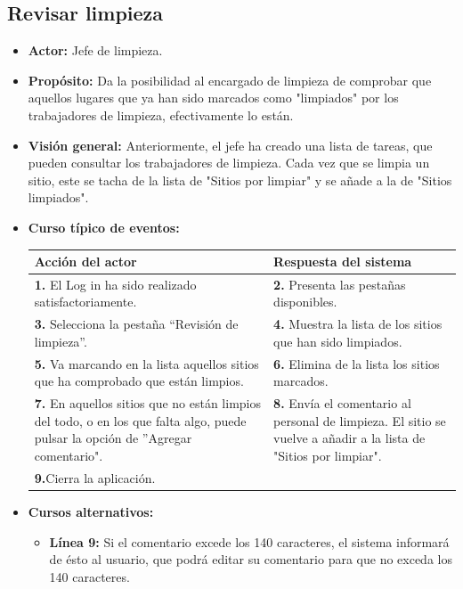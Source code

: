 \documentclass[spanish,a4paper,12pt]{report}	%
\begin{document}

\subsection{Revisar limpieza}
			\begin{itemize}
			\item \textbf{Actor: }Jefe de limpieza.
			\item \textbf{Propósito: }Da la posibilidad al encargado de limpieza de comprobar que aquellos lugares que ya han sido marcados como "limpiados" por los trabajadores de limpieza, efectivamente lo están.  		
			\item \textbf{Visión general: }Anteriormente, el jefe ha creado una lista de tareas, que pueden consultar los trabajadores de limpieza. Cada vez que se limpia un sitio, este se tacha de la lista de "Sitios por limpiar" y se añade a la de "Sitios limpiados".  
			\item \textbf{Curso típico de eventos:}\\ 	%
\begin{tabular}{|p{6cm}||p{6cm}|}
				\hline
				\textbf{Acción del actor} & \textbf{Respuesta del sistema} \\ \hline \hline
				\textbf{1.} El Log in ha sido realizado satisfactoriamente. & \textbf{2.} Presenta las pestañas disponibles.\\ \hline
				\textbf{3.} Selecciona la pestaña “Revisión de limpieza”. & \textbf{4.} Muestra la lista de los sitios que han sido limpiados. \\ \hline
				\textbf{5.} Va marcando en la lista aquellos sitios que ha comprobado que están limpios.	& \textbf{6.} Elimina de la lista los sitios marcados. \\ \hline
				\textbf{7.} En aquellos sitios que no están limpios del todo, o en los que falta algo, puede pulsar la opción de ''Agregar comentario". & \textbf{8.} Envía el comentario al personal de limpieza. El sitio se vuelve a añadir a la lista de "Sitios por limpiar".\\ \hline
				\textbf{9.}Cierra la aplicación. & \textbf{} \\ \hline
			\end{tabular}
			\item \textbf{Cursos alternativos:} 
				\begin{itemize}
					\item \textbf{Línea 9: }Si el comentario excede los 140 caracteres, el sistema informará de ésto al usuario, que podrá editar su comentario para que no exceda los 140 caracteres.
				\end{itemize}
		\end {itemize}
\end{document}
